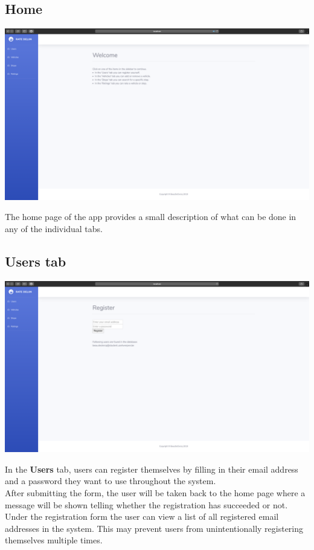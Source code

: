 \documentclass[12pt]{article}
\begin{document}
\subsection{Home}
\begin{center}
	\includegraphics[width=\linewidth]{Images/Home_screen.png}
\end{center}
The home page of the app provides a small description of what can be done in any of the individual tabs.

\subsection{Users tab}
\begin{center}
	\includegraphics[width=\linewidth]{Images/Users_tab.png}
\end{center}
In the \textbf{Users} tab, users can register themselves by filling in their email address and a password they want to use throughout the system.\\
After submitting the form, the user will be taken back to the home page where a message will be shown telling whether the registration has succeeded or not.\\
Under the registration form the user can view a list of all registered email addresses in the system. This may prevent users from unintentionally registering themselves multiple times.
\end{document}
